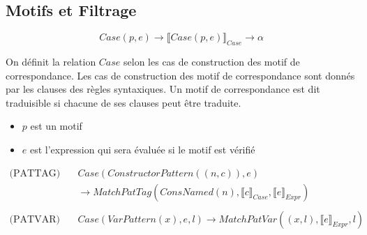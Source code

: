 \documentclass[
  12pt,
]{article}
\providecommand{\tightlist}{%
  \setlength{\itemsep}{0pt}\setlength{\parskip}{0pt}}
\begin{document}
\subsection{Motifs et Filtrage}\label{motifs-et-filtrage}

\[ Case(p,e) \rightarrow \llbracket Case(p,e) \rrbracket_{Case} \rightarrow \alpha \]

On définit la relation \({Case}\) selon les cas de construction
des motif de correspondance. Les cas de construction des motif de
correspondance sont donnés par les clauses des règles syntaxiques. Un
motif de correspondance est dit traduisible si chacune de ses clauses
peut être traduite.
\begin{itemize}
  \tightlist
  \item
        \(p\) est un motif
  \item
        \(e\) est l'expression qui sera évaluée si le motif est vérifié
\end{itemize}
\begin{align*}
  \text{(PATTAG)} \quad    &  Case(ConstructorPattern((n,c)), e)
  \\ &\rightarrow  MatchPatTag(ConsNamed(n), \llbracket c \rrbracket_{Case}, \llbracket e \rrbracket_{Expr})        \\                                                        
  \\
  \text{(PATVAR)} \quad & Case(VarPattern(x), e, l)
  \rightarrow  MatchPatVar((x, l), \llbracket e \rrbracket_{Expr}, l)                              
\end{align*}
\end{document}
